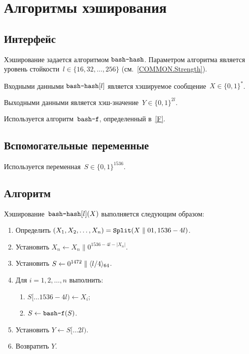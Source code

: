 \chapter{Алгоритмы хэширования}\label{HASH}

\section{Интерфейс}\label{HASH.IFace}

Хэширование задается алгоритмом $\texttt{bash-hash}$.
Параметром алгоритма является уровень стойкости~$l\in\{16,32,\ldots,256\}$ 
(см.~\ref{COMMON.Strength}).

Входными данными $\texttt{bash-hash}[l]$ является хэшируемое 
сообщение~$X\in\{0,1\}^*$.

Выходными данными является хэш-значение~$Y\in\{0,1\}^{2l}$.

Используется алгоритм~$\texttt{bash-f}$, определенный в~\ref{F}.

\section{Вспомогательные переменные}\label{HASH.Vars}

Используется переменная~$S\in\{0,1\}^{1536}$.

\section{Алгоритм}\label{HASH.Alg}

Хэширование~$\texttt{bash-hash}[l](X)$ выполняется следующим образом:
\begin{enumerate}
\item
Определить
$(X_1,X_2,\ldots,X_n)=\mathop{\texttt{Split}}\nolimits(X\parallel 01, 1536-4l)$.

\item
Установить 
$X_n\leftarrow X_n \parallel 0^{1536-4l-|X_n|}$.

\item
Установить
$S\leftarrow 0^{1472}\parallel\langle l/4\rangle_{64}$.

\item
Для $i=1,2,\ldots,n$ выполнить:
\begin{enumerate}
\item
$S[\dots 1536-4l)\leftarrow X_i$;
\item
$S\leftarrow\texttt{bash-f}(S)$.
\end{enumerate}

\item
Установить
$Y\leftarrow S[\dots 2l)$.

\item
Возвратить $Y$.
\end{enumerate}
